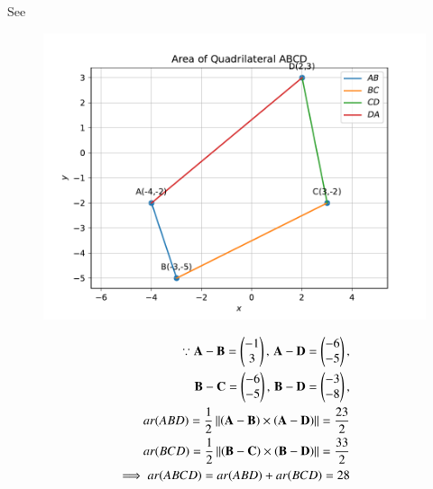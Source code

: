 See 
\begin{figure}[!h]
 \begin{center}
  \includegraphics[width=\columnwidth]{chapters/10/7/3/4/figs/fig.pdf}
 \end{center}
\caption{}
\label{fig:chapters/10/7/3/4/Fig1}
\end{figure}
\begin{align}
\because	\mathbf{A}- \mathbf{B} =\begin{pmatrix}-1\\3\end{pmatrix},\,
	  \mathbf{A}- \mathbf{D} =\begin{pmatrix}-6\\-5\end{pmatrix},
	  \\
	\mathbf{B}- \mathbf{C} =\begin{pmatrix}-6\\-5\end{pmatrix},\,
	  \mathbf{B}- \mathbf{D} =\begin{pmatrix}-3\\-8\end{pmatrix},
	  \\
	  ar(ABD)=\frac{1}{2} \left\lVert\left(\mathbf{A}-\mathbf{B}\right)  \times 
   \left(\mathbf{A}- \mathbf{D}\right)\right\rVert 
	=	\frac{23}{2}
	\\
	  ar(BCD)=\frac{1}{2} \left\lVert\left(\mathbf{B}-\mathbf{C}\right)  \times 
   \left(\mathbf{B}- \mathbf{D}\right)\right\rVert 
	=	\frac{33}{2}
	\\
\implies	ar(ABCD)=  ar(ABD) +  ar(BCD)
	= 28
\end{align}
